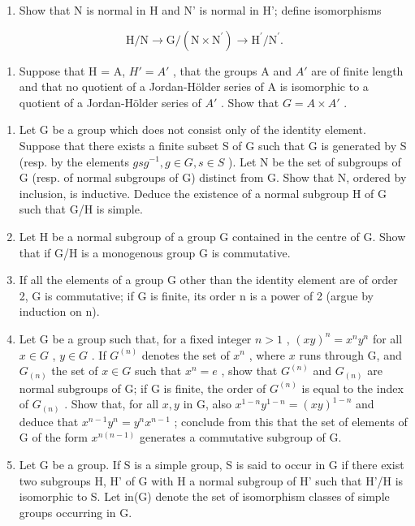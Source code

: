 \begin{enumerate}
\def\labelenumi{(\alph{enumi})}
\tightlist
\item
  Show that N is normal in H and N' is normal in H'; define isomorphisms
\end{enumerate}

\[
\mathrm{H} / \mathrm{N} \rightarrow \mathrm{G} / (\mathrm{N} \times \mathrm{N} ^ {\prime}) \rightarrow \mathrm{H} ^ {\prime} / \mathrm{N} ^ {\prime}.
\]

\begin{enumerate}
\def\labelenumi{(\alph{enumi})}
\setcounter{enumi}{1}
\tightlist
\item
  Suppose that H = A, \(H' = A'\) , that the groups A and \(A'\) are of finite length and that no quotient of a Jordan-Hölder series of A is isomorphic to a quotient of a Jordan-Hölder series of \(A'\) . Show that \(G = A \times A'\) .
\end{enumerate}

\begin{enumerate}
\def\labelenumi{\arabic{enumi}.}
\setcounter{enumi}{8}
\item
  Let G be a group which does not consist only of the identity element. Suppose that there exists a finite subset S of G such that G is generated by S (resp. by the elements \(gsg^{-1}, g \in G, s \in S\) ). Let N be the set of subgroups of G (resp. of normal subgroups of G) distinct from G. Show that N, ordered by inclusion, is inductive. Deduce the existence of a normal subgroup H of G such that G/H is simple.
\item
  Let H be a normal subgroup of a group G contained in the centre of G. Show that if G/H is a monogenous group G is commutative.
\item
  If all the elements of a group G other than the identity element are of order 2, G is commutative; if G is finite, its order n is a power of 2 (argue by induction on n).
\item
  Let G be a group such that, for a fixed integer \(n > 1\) , \((xy)^n = x^n y^n\) for all \(x \in G\) , \(y \in G\) . If \(G^{(n)}\) denotes the set of \(x^n\) , where \(x\) runs through G, and \(G_{(n)}\) the set of \(x \in G\) such that \(x^n = e\) , show that \(G^{(n)}\) and \(G_{(n)}\) are normal subgroups of G; if G is finite, the order of \(G^{(n)}\) is equal to the index of \(G_{(n)}\) . Show that, for all \(x, y\) in G, also \(x^{1-n}y^{1-n} = (xy)^{1-n}\) and deduce that \(x^{n-1}y^n = y^n x^{n-1}\) ; conclude from this that the set of elements of G of the form \(x^{n(n-1)}\) generates a commutative subgroup of G.
\item
  Let G be a group. If S is a simple group, S is said to occur in G if there exist two subgroups H, H' of G with H a normal subgroup of H' such that H'/H is isomorphic to S. Let in(G) denote the set of isomorphism classes of simple groups occurring in G.
\end{enumerate}

